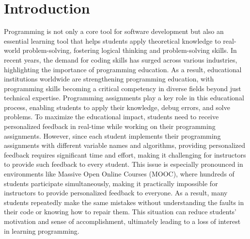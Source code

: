 \documentclass[10pt,conference]{IEEEtran}
\begin{document}
\section{Introduction}
    Programming is not only a core tool for software development but also an essential learning tool that helps students apply theoretical knowledge to real-world problem-solving, fostering logical thinking and problem-solving skills. In recent years, the demand for coding skills has surged across various industries, highlighting the importance of programming education. As a result, educational institutions worldwide are strengthening programming education, with programming skills becoming a critical competency in diverse fields beyond just technical expertise. Programming assignments play a key role in this educational process, enabling students to apply their knowledge, debug errors, and solve problems. To maximize the educational impact, students need to receive personalized feedback in real-time while working on their programming assignments. However, since each student implements their programming assignments with different variable names and algorithms, providing personalized feedback requires significant time and effort, making it challenging for instructors to provide such feedback to every student. This issue is especially pronounced in environments like Massive Open Online Courses (MOOC), where hundreds of students participate simultaneously, making it practically impossible for instructors to provide personalized feedback to everyone. As a result, many students repeatedly make the same mistakes without understanding the faults in their code or knowing how to repair them. This situation can reduce students' motivation and sense of accomplishment, ultimately leading to a loss of interest in learning programming.
\end{document}
